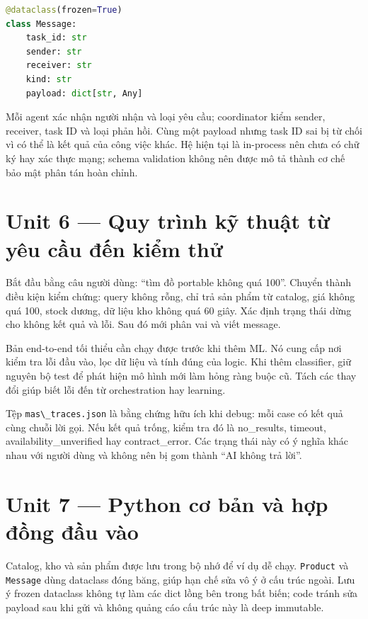 \begin{lstlisting}[language=Python]
@dataclass(frozen=True)
class Message:
    task_id: str
    sender: str
    receiver: str
    kind: str
    payload: dict[str, Any]
\end{lstlisting}

Mỗi agent xác nhận người nhận và loại yêu cầu; coordinator kiểm sender,
receiver, task ID và loại phản hồi. Cùng một payload nhưng task ID sai
bị từ chối vì có thể là kết quả của công việc khác. Hệ hiện tại là
in-process nên chưa có chữ ký hay xác thực mạng; schema validation không
nên được mô tả thành cơ chế bảo mật phân tán hoàn chỉnh.

\section{Unit 6 --- Quy trình kỹ thuật từ yêu cầu đến kiểm
thử}\label{unit-6-quy-truxecnh-kux1ef9-thuux1eadt-tux1eeb-yuxeau-cux1ea7u-ux111ux1ebfn-kiux1ec3m-thux1eed}

Bắt đầu bằng câu người dùng: ``tìm đồ portable không quá 100''. Chuyển
thành điều kiện kiểm chứng: query không rỗng, chỉ trả sản phẩm từ
catalog, giá không quá 100, stock dương, dữ liệu kho không quá 60 giây.
Xác định trạng thái dừng cho không kết quả và lỗi. Sau đó mới phân vai
và viết message.

Bản end-to-end tối thiểu cần chạy được trước khi thêm ML. Nó cung cấp
nơi kiểm tra lỗi đầu vào, lọc dữ liệu và tính đúng của logic. Khi thêm
classifier, giữ nguyên bộ test để phát hiện mô hình mới làm hỏng ràng
buộc cũ. Tách các thay đổi giúp biết lỗi đến từ orchestration hay
learning.

Tệp \passthrough{\lstinline!mas\_traces.json!} là bằng chứng hữu ích khi
debug: mỗi case có kết quả cùng chuỗi lời gọi. Nếu kết quả trống, kiểm
tra đó là no\_results, timeout, availability\_unverified hay
contract\_error. Các trạng thái này có ý nghĩa khác nhau với người dùng
và không nên bị gom thành ``AI không trả lời''.

\section{Unit 7 --- Python cơ bản và hợp đồng đầu
vào}\label{unit-7-python-cux1a1-bux1ea3n-vuxe0-hux1ee3p-ux111ux1ed3ng-ux111ux1ea7u-vuxe0o}

Catalog, kho và sản phẩm được lưu trong bộ nhớ để ví dụ dễ chạy.
\passthrough{\lstinline!Product!} và \passthrough{\lstinline!Message!}
dùng dataclass đóng băng, giúp hạn chế sửa vô ý ở cấu trúc ngoài. Lưu ý
frozen dataclass không tự làm các dict lồng bên trong bất biến; code
tránh sửa payload sau khi gửi và không quảng cáo cấu trúc này là deep
immutable.

